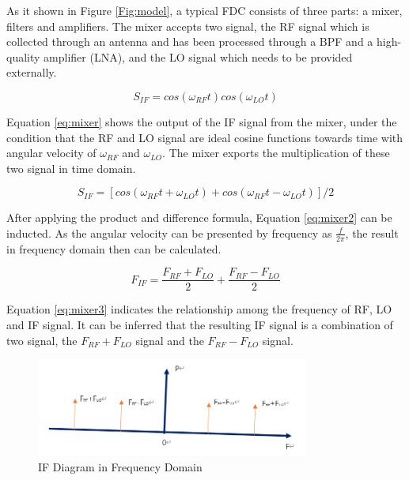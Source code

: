 \documentclass[12pt, a4paper]{report}
\begin{document}
As it shown in Figure \ref{Fig:model}, a typical FDC consists of three parts: a mixer, filters and amplifiers. The mixer accepts two signal, the RF signal which is collected through an antenna and has been processed through a BPF and a high-quality amplifier (LNA), and the LO signal which needs to be provided externally. 


\begin{equation}
S_{IF} = cos(\omega_{RF}t) cos(\omega_{LO}t)
\label{eq:mixer}
\end{equation}

Equation \ref{eq:mixer} shows the output of the IF signal from the mixer, under the condition that the RF and LO signal are ideal cosine functions towards time with angular velocity of $\omega_{RF}$ and $\omega_{LO}$. The mixer exports the multiplication of these two signal in time domain.

\begin{equation}
S_{IF} = [cos(\omega_{RF}t+\omega_{LO}t)+cos(\omega_{RF}t-\omega_{LO}t)]/2
\label{eq:mixer2}
\end{equation}

After applying the product and difference formula, Equation \ref{eq:mixer2} can be inducted. As the angular velocity can be presented by frequency as $\frac{f}{2\pi}$, the result in frequency domain then can be calculated.

\begin{equation}
F_{IF} = \frac{F_{RF}+F_{LO}}{2}+\frac{F_{RF}-F_{LO}}{2}
\label{eq:mixer3}
\end{equation}

Equation \ref{eq:mixer3} indicates the relationship among the frequency of RF, LO and IF signal. It can be inferred that the resulting IF signal is a combination of two signal, the $F_{RF}+F_{LO}$ signal and the $F_{RF}-F_{LO}$ signal.


\begin{figure}[htbp]     \begin{centering}
    \includegraphics[width=0.8\textwidth]{img/ff.png}
    \caption{\label{Fig:ff}IF Diagram in Frequency Domain}
    \end{centering}
\end{figure}
\end{document}
